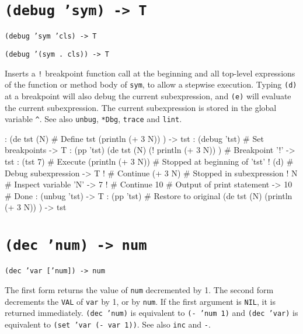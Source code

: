  
\section*{\texttt{(debug 'sym) -> T}}
\label{sec:func-ref-D-(debug 'sym) -> T}


\texttt{(debug 'sym 'cls) -> T}

\texttt{(debug '(sym . cls)) -> T}

Inserts a \texttt{!} breakpoint function call at the beginning and all
top-level expressions of the function or method body of \texttt{sym}, to allow
a stepwise execution. Typing \texttt{(d)} at a breakpoint will also debug the
current subexpression, and \texttt{(e)} will evaluate the current
subexpression. The current subexpression is stored in the global
variable \texttt{\textasciicircum{}}. See also \texttt{unbug}, \texttt{*Dbg}, \texttt{trace} and \texttt{lint}.


\begin{wideverbatim}
: (de tst (N)                    # Define tst
   (println (+ 3 N)) )
-> tst
: (debug 'tst)                   # Set breakpoints
-> T
: (pp 'tst)
(de tst (N)
   (! println (+ 3 N)) )         # Breakpoint '!'
-> tst
: (tst 7)                        # Execute
(println (+ 3 N))                # Stopped at beginning of 'tst'
! (d)                            # Debug subexpression
-> T
!                                # Continue
(+ 3 N)                          # Stopped in subexpression
! N                              # Inspect variable 'N'
-> 7
!                                # Continue
10                               # Output of print statement
-> 10                            # Done
: (unbug 'tst)
-> T
: (pp 'tst)                      # Restore to original
(de tst (N)
   (println (+ 3 N)) )
-> tst
\end{wideverbatim}

 
\section*{\texttt{(dec 'num) -> num}}
\label{sec:func-ref-D-(dec 'num) -> num}


\texttt{(dec 'var ['num]) -> num}

The first form returns the value of \texttt{num} decremented by 1. The second
form decrements the \texttt{VAL} of \texttt{var} by 1, or by \texttt{num}. If the first
argument is \texttt{NIL}, it is returned immediately. \texttt{(dec 'num)} is
equivalent to \texttt{(- 'num 1)} and \texttt{(dec 'var)} is equivalent to
\texttt{(set 'var (- var 1))}. See also \texttt{inc} and \texttt{-}.


